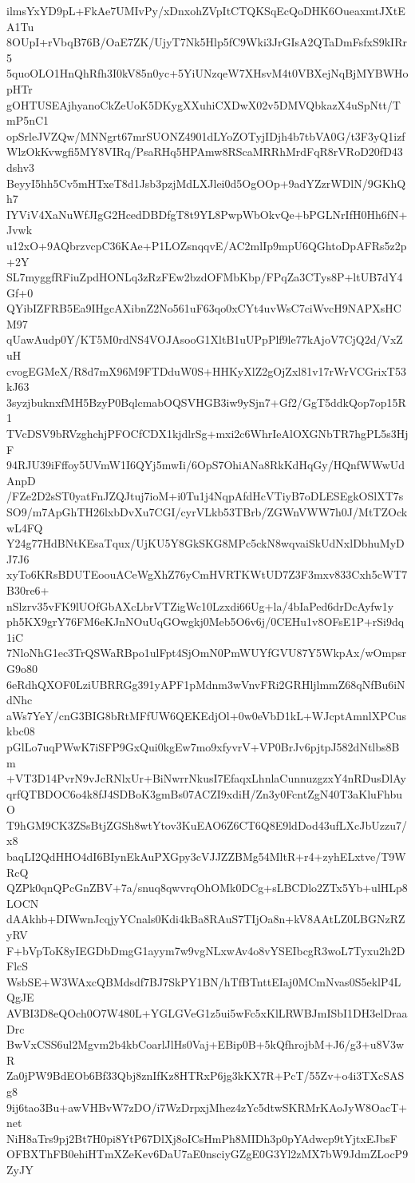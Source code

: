 ilmsYxYD9pL+FkAe7UMIvPy/xDnxohZVpItCTQKSqEcQoDHK6OueaxmtJXtEA1Tu
8OUpI+rVbqB76B/OaE7ZK/UjyT7Nk5Hlp5fC9Wki3JrGIsA2QTaDmFsfxS9kIRr5
5quoOLO1HnQhRfh3I0kV85n0yc+5YiUNzqeW7XHsvM4t0VBXejNqBjMYBWHopHTr
gOHTUSEAjhyanoCkZeUoK5DKygXXuhiCXDwX02v5DMVQbkazX4uSpNtt/TmP5nC1
opSrleJVZQw/MNNgrt67mrSUONZ4901dLYoZOTyjIDjh4b7tbVA0G/t3F3yQ1izf
WlzOkKvwgfi5MY8VIRq/PsaRHq5HPAmw8RScaMRRhMrdFqR8rVRoD20fD43dshv3
BeyyI5hh5Cv5mHTxeT8d1Jsb3pzjMdLXJlei0d5OgOOp+9adYZzrWDlN/9GKhQh7
IYViV4XaNuWfJIgG2HcedDBDfgT8t9YL8PwpWbOkvQe+bPGLNrIfH0Hh6fN+Jvwk
u12xO+9AQbrzvcpC36KAe+P1LOZsnqqvE/AC2mlIp9mpU6QGhtoDpAFRs5z2p+2Y
SL7myggfRFiuZpdHONLq3zRzFEw2bzdOFMbKbp/FPqZa3CTys8P+ltUB7dY4Gf+0
QYibIZFRB5Ea9IHgcAXibnZ2No561uF63qo0xCYt4uvWsC7ciWvcH9NAPXsHCM97
qUawAudp0Y/KT5M0rdNS4VOJAsooG1XltB1uUPpPlf9le77kAjoV7CjQ2d/VxZuH
cvogEGMeX/R8d7mX96M9FTDduW0S+HHKyXlZ2gOjZxl81v17rWrVCGrixT53kJ63
3syzjbuknxfMH5BzyP0BqlcmabOQSVHGB3iw9ySjn7+Gf2/GgT5ddkQop7op15R1
TVcDSV9bRVzghchjPFOCfCDX1kjdlrSg+mxi2c6WhrIeAlOXGNbTR7hgPL5s3HjF
94RJU39iFffoy5UVmW1I6QYj5mwIi/6OpS7OhiANa8RkKdHqGy/HQnfWWwUdAnpD
/FZe2D2sST0yatFnJZQJtuj7ioM+i0Tu1j4NqpAfdHcVTiyB7oDLESEgkOSlXT7s
SO9/m7ApGhTH26lxbDvXu7CGI/cyrVLkb53TBrb/ZGWnVWW7h0J/MtTZOckwL4FQ
Y24g77HdBNtKEsaTqux/UjKU5Y8GkSKG8MPc5ckN8wqvaiSkUdNxlDbhuMyDJ7J6
xyTo6KRsBDUTEoouACeWgXhZ76yCmHVRTKWtUD7Z3F3mxv833Cxh5cWT7B30re6+
nSlzrv35vFK9lUOfGbAXcLbrVTZigWc10Lzxdi66Ug+la/4bIaPed6drDcAyfw1y
ph5KX9grY76FM6eKJnNOuUqGOwgkj0Meb5O6v6j/0CEHu1v8OFsE1P+rSi9dq1iC
7NloNhG1ec3TrQSWaRBpo1ulFpt4SjOmN0PmWUYfGVU87Y5WkpAx/wOmpsrG9o80
6eRdhQXOF0LziUBRRGg391yAPF1pMdnm3wVnvFRi2GRHljlmmZ68qNfBu6iNdNhc
aWs7YeY/cnG3BIG8bRtMFfUW6QEKEdjOl+0w0eVbD1kL+WJcptAmnlXPCuskbc08
pGlLo7uqPWwK7iSFP9GxQui0kgEw7mo9xfyvrV+VP0BrJv6pjtpJ582dNtlbs8Bm
+VT3D14PvrN9vJcRNlxUr+BiNwrrNkusI7EfaqxLhnlaCunnuzgzxY4nRDusDlAy
qrfQTBDOC6o4k8fJ4SDBoK3gmBs07ACZI9xdiH/Zn3y0FcntZgN40T3aKluFhbuO
T9hGM9CK3ZSsBtjZGSh8wtYtov3KuEAO6Z6CT6Q8E9ldDod43ufLXcJbUzzu7/x8
baqLI2QdHHO4dI6BIynEkAuPXGpy3cVJJZZBMg54MltR+r4+zyhELxtve/T9WRcQ
QZPk0qnQPcGnZBV+7a/snuq8qwvrqOhOMk0DCg+sLBCDlo2ZTx5Yb+ulHLp8LOCN
dAAkhb+DIWwnJcqjyYCnals0Kdi4kBa8RAuS7TIjOa8n+kV8AAtLZ0LBGNzRZyRV
F+bVpToK8yIEGDbDmgG1ayym7w9vgNLxwAv4o8vYSEIbcgR3woL7Tyxu2h2DFlcS
WsbSE+W3WAxcQBMdsdf7BJ7SkPY1BN/hTfBTnttEIaj0MCmNvas0S5eklP4LQgJE
AVBI3D8eQOch0O7W480L+YGLGVeG1z5ui5wFc5xKlLRWBJmISbI1DH3elDraaDrc
BwVxCSS6ul2Mgvm2b4kbCoarlJlHs0Vaj+EBip0B+5kQfhrojbM+J6/g3+u8V3wR
Za0jPW9BdEOb6Bf33Qbj8znIfKz8HTRxP6jg3kKX7R+PcT/55Zv+o4i3TXcSASg8
9ij6tao3Bu+awVHBvW7zDO/i7WzDrpxjMhez4zYc5dtwSKRMrKAoJyW8OacT+net
NiH8aTrs9pj2Bt7H0pi8YtP67DlXj8oICsHmPh8MIDh3p0pYAdwcp9tYjtxEJbsF
OFBXThFB0ehiHTmXZeKev6DaU7aE0nsciyGZgE0G3Yl2zMX7bW9JdmZLocP9ZyJY
